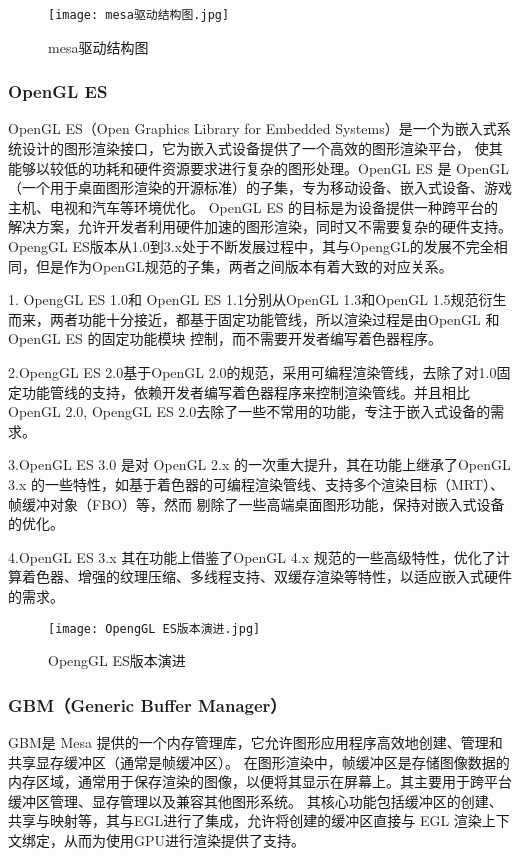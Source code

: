 \begin{figure}[h]
  \centering
  \texttt{[image: mesa驱动结构图.jpg]}
  \caption{mesa驱动结构图}
  \label{fig:mesa驱动结构图}
\end{figure}

\subsubsection{OpenGL ES}
OpenGL ES（Open Graphics Library for Embedded Systems）是一个为嵌入式系统设计的图形渲染接口，它为嵌入式设备提供了一个高效的图形渲染平台，
使其能够以较低的功耗和硬件资源要求进行复杂的图形处理。OpenGL ES 是 OpenGL（一个用于桌面图形渲染的开源标准）的子集，专为移动设备、嵌入式设备、游戏主机、电视和汽车等环境优化。
OpenGL ES 的目标是为设备提供一种跨平台的解决方案，允许开发者利用硬件加速的图形渲染，同时又不需要复杂的硬件支持。
OpengGL ES版本从1.0到3.x处于不断发展过程中，其与OpengGL的发展不完全相同，但是作为OpenGL规范的子集，两者之间版本有着大致的对应关系。

1. OpengGL ES 1.0和 OpenGL ES 1.1分别从OpenGL 1.3和OpenGL 1.5规范衍生而来，两者功能十分接近，都基于固定功能管线，所以渲染过程是由OpenGL 和 OpenGL ES 的固定功能模块
控制，而不需要开发者编写着色器程序。

2.OpengGL ES 2.0基于OpenGL 2.0的规范，采用可编程渲染管线，去除了对1.0固定功能管线的支持，依赖开发者编写着色器程序来控制渲染管线。并且相比OpenGL 2.0,
OpengGL ES 2.0去除了一些不常用的功能，专注于嵌入式设备的需求。

3.OpenGL ES 3.0 是对 OpenGL 2.x 的一次重大提升，其在功能上继承了OpenGL 3.x 的一些特性，如基于着色器的可编程渲染管线、支持多个渲染目标（MRT）、帧缓冲对象（FBO）等，然而
剔除了一些高端桌面图形功能，保持对嵌入式设备的优化。

4.OpenGL ES 3.x 其在功能上借鉴了OpenGL 4.x 规范的一些高级特性，优化了计算着色器、增强的纹理压缩、多线程支持、双缓存渲染等特性，以适应嵌入式硬件的需求。

\begin{figure}[h]
  \centering
  \texttt{[image: OpengGL ES版本演进.jpg]}
  \caption{OpengGL ES版本演进}
  \label{fig:OpengGL ES版本演进}
\end{figure}

\subsubsection{GBM（Generic Buffer Manager）}
GBM是 Mesa 提供的一个内存管理库，它允许图形应用程序高效地创建、管理和共享显存缓冲区（通常是帧缓冲区）。
在图形渲染中，帧缓冲区是存储图像数据的内存区域，通常用于保存渲染的图像，以便将其显示在屏幕上。其主要用于跨平台缓冲区管理、显存管理以及兼容其他图形系统。
其核心功能包括缓冲区的创建、共享与映射等，其与EGL进行了集成，允许将创建的缓冲区直接与 EGL 渲染上下文绑定，从而为使用GPU进行渲染提供了支持。

